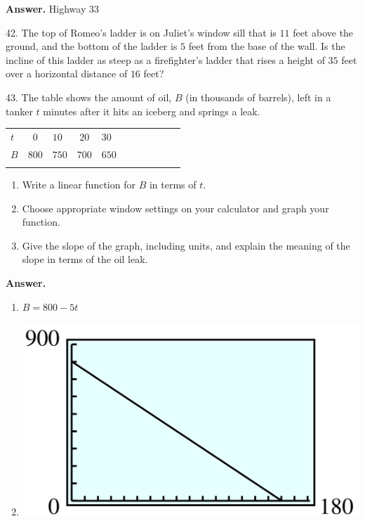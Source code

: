 \documentclass[10pt,]{book}
\theoremstyle{plain}
\theoremstyle{definition}
\theoremstyle{definition}
\theoremstyle{definition}
\theoremstyle{definition}
\numberwithin{equation}{part}
\newcommand{\hrulethin}  {\noalign{\hrule height 0.04em}}
\newcommand{\hrulethick} {\noalign{\hrule height 0.11em}}
\begin{document}
\begin{exerciselist}
\par\smallskip
\par\smallskip
\noindent\textbf{Answer.}\hypertarget{answer-242}{}\quad
Highway 33%
\item[42.]\hypertarget{exercise-438}{}The top of Romeo's ladder is on Juliet's window sill that is \(11\) feet above the ground, and the bottom of the ladder is \(5\) feet from the base of the wall. Is the incline of this ladder as steep as a firefighter's ladder that rises a height of \(35\) feet over a horizontal distance of \(16\) feet?%
\par\smallskip
\item[43.]\hypertarget{exercise-439}{}The table shows the amount of oil, \(B\) (in thousands of barrels), left in a tanker \(t\) minutes after it hits an iceberg and springs a leak. \begin{table}
\centering
\begin{tabular}{AcAcAcAcAcA}\hrulethick
\(t\)&\(0\)&\(10\)&\(20\)&\(30\)\tabularnewline\hrulethin
\(B\)&\(800\)&\(750\)&\(700\)&\(650\)\tabularnewline\hrulethin
\end{tabular}
\end{table}
 \leavevmode%
\begin{enumerate}[label=*\alph**]
\item\hypertarget{li-1601}{}Write a linear function for \(B\) in terms of \(t\).%
\item\hypertarget{li-1602}{}Choose appropriate window settings on your calculator and graph your function.%
\item\hypertarget{li-1603}{}Give the slope of the graph, including units, and explain the meaning of the slope in terms of the oil leak.%
\end{enumerate}
%
\par\smallskip
\par\smallskip
\noindent\textbf{Answer.}\hypertarget{answer-243}{}\quad
\leavevmode%
\begin{enumerate}[label=*\alph**]
\item\hypertarget{li-1604}{}\(B = 800 - 5t\)%
\item\hypertarget{li-1605}{}\includegraphics[width=0.4\linewidth]{images/fig-ans-chap1-rev-43.jpg}

\end{enumerate}
\end{exerciselist}
\end{document}
